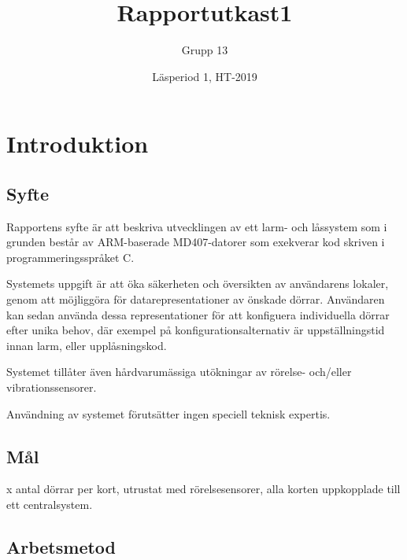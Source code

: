 \documentclass{article}
\title{Rapportutkast1}
\author{Grupp 13}
\date{Läsperiod 1, HT-2019}
\begin{document}
\maketitle
{}
\newpage

\tableofcontents
\newpage



\section{Introduktion}
\subsection{Syfte} %
Rapportens syfte är att beskriva utvecklingen av ett larm- och
 låssystem som i grunden består av ARM-baserade MD407-datorer
  som exekverar kod skriven i programmeringsspråket C.

Systemets uppgift är att öka säkerheten och översikten av
 användarens lokaler, genom att möjliggöra för
 datarepresentationer av önskade dörrar. Användaren
 kan sedan använda dessa representationer för att konfiguera
 individuella dörrar efter unika behov, där exempel på
 konfigurationsalternativ är uppställningstid innan larm,
  eller upplåsningskod.

Systemet tillåter även hårdvarumässiga utökningar av
rörelse- och/eller vibrationssensorer.

Användning av systemet förutsätter ingen speciell
teknisk expertis.


\subsection{Mål} %
x antal dörrar per kort, utrustat med rörelsesensorer, alla korten
 uppkopplade till ett centralsystem.

\subsection{Arbetsmetod} %
\end{document}
